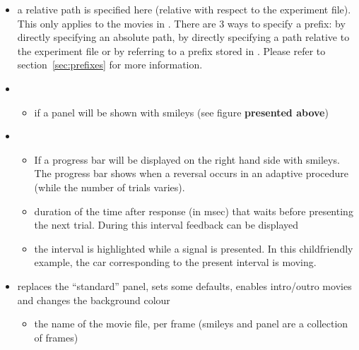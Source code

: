 \begin{itemize}
\item {} a relative path is specified here
(relative with respect to the experiment file). This only applies
to the movies in . There are 3 ways to specify a
prefix: by directly specifying an absolute path, by directly
specifying a path relative to the experiment file or by referring
to a prefix stored in . Please refer to
section~\ref{sec:prefixes} for more information. 

\item {}

\begin{itemize}

\item {} if  a panel will be shown
with smileys (see figure \textbf{presented above})

\end{itemize}

\item {}
\begin{itemize}
\item {} If  a progress bar will be
displayed on the right hand side with smileys. The progress bar
shows when a reversal occurs in an adaptive procedure (while the
number of trials varies). 

\item {} duration of the time after
response (in msec) that \apex waits before presenting the next
trial. During this interval feedback can be displayed

\item {} the interval is highlighted while a
signal is presented. In this childfriendly example, the car corresponding to the present interval is moving.

\end{itemize}

\item{} replaces the ``standard'' panel, sets
some defaults, enables intro/outro movies and changes the
background colour

\begin{itemize}

\item {} the name of the movie file, per frame
(smileys and panel are a collection of frames) 

\end{itemize}

\end{itemize}

